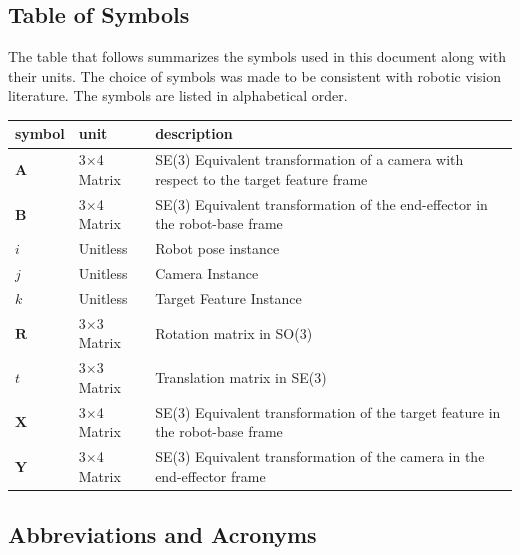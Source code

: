 \documentclass[12pt]{article}
\begin{document}
\subsection{Table of Symbols}

The table that follows summarizes the symbols used in this document along with
their units.  The choice of symbols was made to be consistent with robotic vision literature. 
The symbols are listed in alphabetical order.

\renewcommand{\arraystretch}{1.2}
\noindent \begin{longtable*}{l l p{12cm}} \toprule
\textbf{symbol} & \textbf{unit} & \textbf{description}\\
\midrule 
$\textbf{A}$ & 3$\times$4 Matrix & SE(3) Equivalent transformation of a camera 
with respect to the target feature frame
\\
$\textbf{B}$ & 3$\times$4 Matrix & SE(3) Equivalent transformation of the 
end-effector in the robot-base frame
\\
$i$ & Unitless & Robot pose instance
\\
$j$ &	Unitless & Camera Instance
\\
$k$ &	Unitless & Target Feature Instance
\\
$\textbf{R}$ & 3$\times$3 Matrix & Rotation matrix in SO(3)
\\
$\textit{t}$ & 3$\times$3 Matrix & Translation matrix in SE(3)
\\
$\textbf{X}$ & 3$\times$4 Matrix & SE(3) Equivalent transformation of the target 
feature in the robot-base frame
\\
$\textbf{Y}$ & 3$\times$4 Matrix & SE(3) Equivalent transformation of the camera 
in the end-effector frame
\\ 
\bottomrule
\end{longtable*}

\subsection{Abbreviations and Acronyms}
\end{document}
